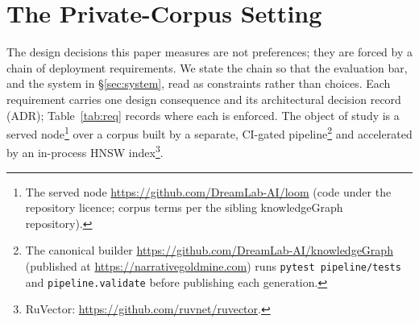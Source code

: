 \documentclass[10pt,twocolumn]{article}
\begin{document}
\section{The Private-Corpus Setting}\label{sec:setting}
The design decisions this paper measures are not preferences; they are forced by a chain of
deployment requirements. We state the chain so that the evaluation bar, and the system in
\S\ref{sec:system}, read as constraints rather than choices. Each requirement carries one design
consequence and its architectural decision record (ADR); Table~\ref{tab:req} records where each is
enforced. The object of study is a served node\footnote{The served node
\url{https://github.com/DreamLab-AI/loom} (code under the repository licence; corpus terms per the
sibling knowledgeGraph repository).} over a corpus built by a separate, CI-gated
pipeline\footnote{The canonical builder \url{https://github.com/DreamLab-AI/knowledgeGraph} (published at \url{https://narrativegoldmine.com}) runs
\texttt{pytest pipeline/tests} and \texttt{pipeline.validate} before publishing each generation.}
and accelerated by an in-process HNSW index\footnote{RuVector:
\url{https://github.com/ruvnet/ruvector}.}.
\end{document}
